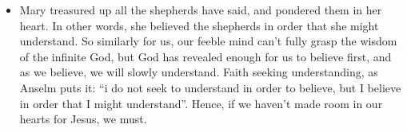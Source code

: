 \begin{itemize}
{\begin{itemize}
{    worshipped Jesus.  On the other hand, there were others who wondered by
    didn’t necessarily believe (v18).  Well, you can’t wonder forever; you
    must eventually decide to believe this good news, or to not believe and
    hence die in your sins.}
    \item{Mary treasured up all the shepherds have said, and pondered them in
    her heart.  In other words, she believed the shepherds in order that she
    might understand.  So similarly for us, our feeble mind can’t fully grasp
    the wisdom of the infinite God, but God has revealed enough for us to
    believe first, and as we believe, we will slowly understand.  Faith
    seeking understanding, as Anselm puts it: “i do not seek to understand in
    order to believe, but I believe in order that I might understand”.
    Hence, if we haven’t made room in our hearts for Jesus, we must.}
  \end{itemize}}
\end{itemize}